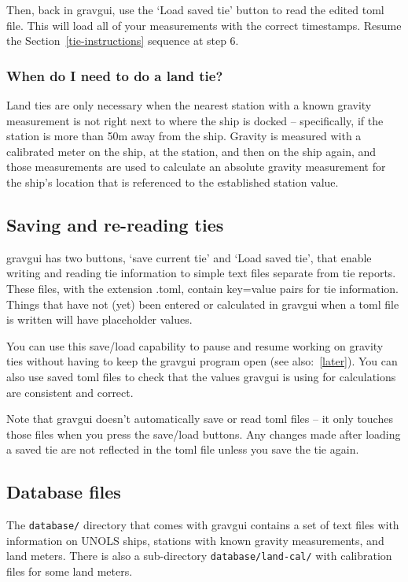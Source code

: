 \documentclass{pfpe-manual}
\begin{document}
Then, back in gravgui, use the `Load saved tie' button to read the edited toml file. This will load all of your measurements with the correct timestamps. Resume the Section~\ref{tie-instructions} sequence at step 6.

\subsubsection{When do I need to do a land tie?}
Land ties are only necessary when the nearest station with a known gravity measurement is not right next to where the ship is docked -- specifically, if the station is more than 50m away from the ship. Gravity is measured with a calibrated meter on the ship, at the station, and then on the ship again, and those measurements are used to calculate an absolute gravity measurement for the ship's location that is referenced to the established station value.

\subsection{Saving and re-reading ties}
\label{save-re}
gravgui has two buttons, `save current tie' and `Load saved tie', that enable writing and reading tie information to simple text files separate from tie reports. These files, with the extension .toml, contain key=value pairs for tie information. Things that have not (yet) been entered or calculated in gravgui when a toml file is written will have placeholder values.

You can use this save/load capability to pause and resume working on gravity ties without having to keep the gravgui program open (see also:~\ref{later}). You can also use saved toml files to check that the values gravgui is using for calculations are consistent and correct. 

Note that gravgui doesn't automatically save or read toml files -- it only touches those files when you press the save/load buttons. Any changes made after loading a saved tie are not reflected in the toml file unless you save the tie again.

\subsection{Database files}
\label{datab}
The \texttt{database/} directory that comes with gravgui contains a set of text files with information on UNOLS ships, stations with known gravity measurements, and land meters. There is also a sub-directory \texttt{database/land-cal/} with calibration files for some land meters.
\end{document}
